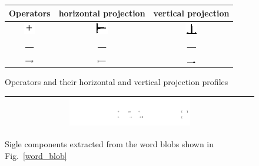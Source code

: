 \documentclass[oneside,a4paper,12pt]{book}
\begin{document}
\begin{figure}[htb]\center\footnotesize
\begin{tabular}{|c|c|c|}
\hline
Operators & horizontal projection & vertical projection\\ \hline
\includegraphics[width=0.2in, height=0.2in]{plus.png} &
\includegraphics[width=0.2in,height=0.2in ]{plusH.png} & 
\includegraphics[width=0.2in,height=0.2in]{plusV.png}\\ \hline
\includegraphics[width=0.2in, height=0.02in]{minus.png} &
\includegraphics[width=0.2in,height=0.02in ]{minusH.png} & 
\includegraphics[width=0.2in,height=0.02in]{minusV.png}\\ \hline
\includegraphics[width=0.2in, height=0.05in]{arrow.png} &
\includegraphics[width=0.2in,height=0.05in ]{arrowH.png} & 
\includegraphics[width=0.2in,height=0.05in]{arrowV.png}\\ \hline
\end{tabular} 
 \caption{Operators and their horizontal and vertical projection profiles}
 \label{h_v_profile}
\end{figure}
\begin{figure}[h]\center\footnotesize
\begin{tabular}{|c|}\hline
 \includegraphics[width=0.5\textwidth]{singleChar.png} \\\hline
 \end{tabular} 
 \caption{Sigle components extracted from the word blobs shown in Fig.~\ref{word_blob}}
 \label{single_char}
\end{figure}
\end{document}
